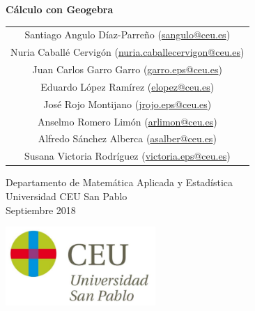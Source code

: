 \begin{titlepage}
\thispagestyle{empty}
\vspace*{7cm}
\par

\begin{center}
\normalfont\fontsize{30}{30}\selectfont
{\bfseries \color{blueceu}Cálculo con Geogebra}
\end{center}
\vspace{1cm}

\begin{center}
\Large
\begin{tabular}{c}
Santiago Angulo Díaz-Parreño (\url{sangulo@ceu.es})\\
Nuria Caballé Cervigón (\url{nuria.caballecervigon@ceu.es})\\
Juan Carlos Garro Garro (\url{garro.eps@ceu.es})\\
Eduardo López Ramírez (\url{elopez@ceu.es})\\
José Rojo Montijano (\url{jrojo.eps@ceu.es})\\
Anselmo Romero Limón (\url{arlimon@ceu.es})\\
Alfredo Sánchez Alberca (\url{asalber@ceu.es})\\
Susana Victoria Rodríguez (\url{victoria.eps@ceu.es})
\end{tabular}

\medskip 
Departamento de Matemática Aplicada y Estadística\\ Universidad CEU San Pablo\\[1cm]
\medskip 
Septiembre 2018

\vspace{1cm}
\includegraphics[height=3cm]{img/logo_uspceu}
\end{center}
\vfill
\end{titlepage}